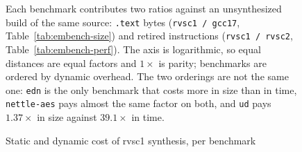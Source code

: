\begin{figure}[htb]
\begin{SingleSpace}

\vspace{0.4em}
{\footnotesize\color{black!60}\raggedright
Each benchmark contributes two ratios against an unsynthesized build of the same
source: \texttt{.text} bytes (\texttt{rvsc1 / gcc17},
Table~\ref{tab:embench-size}) and retired instructions
(\texttt{rvsc1 / rvsc2}, Table~\ref{tab:embench-perf}). The axis is logarithmic,
so equal distances are equal factors and $1\times$ is parity; benchmarks are
ordered by dynamic overhead. The two orderings are not the same one:
\texttt{edn} is the only benchmark that costs more in size than in time,
\texttt{nettle-aes} pays almost the same factor on both, and \texttt{ud} pays
$1.37\times$ in size against $39.1\times$ in time.\par}

\end{SingleSpace}
\caption{Static and dynamic cost of rvsc1 synthesis, per benchmark}
\label{fig:embench-overhead}
\end{figure}
